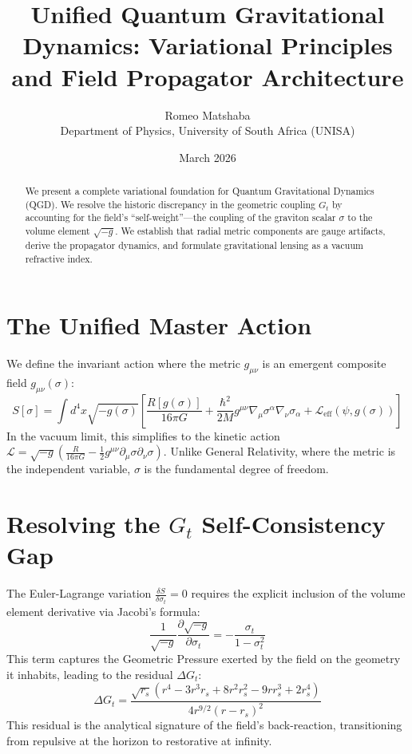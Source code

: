 \documentclass[11pt,a4paper]{article}
\title{\textbf{Unified Quantum Gravitational Dynamics: Variational Principles and Field Propagator Architecture}}
\author{Romeo Matshaba \\ \small Department of Physics, University of South Africa (UNISA)}
\date{March 2026}
\begin{document}
\maketitle

\begin{abstract}
We present a complete variational foundation for Quantum Gravitational Dynamics (QGD). We resolve the historic discrepancy in the geometric coupling $G_t$ by accounting for the field's ``self-weight''—the coupling of the graviton scalar $\sigma$ to the volume element $\sqrt{-g}$. We establish that radial metric components are gauge artifacts, derive the propagator dynamics, and formulate gravitational lensing as a vacuum refractive index.
\end{abstract}

\section{The Unified Master Action}
We define the invariant action where the metric $g_{\mu\nu}$ is an emergent composite field $g_{\mu\nu}(\sigma)$:
\begin{equation}
S[\sigma] = \int d^4x \sqrt{-g(\sigma)} \left[ \frac{R[g(\sigma)]}{16\pi G} + \frac{\hbar^2}{2M}g^{\mu\nu}\nabla_\mu\sigma^\alpha\nabla_\nu\sigma_\alpha + \mathcal{L}_{\mathrm{eff}}(\psi, g(\sigma)) \right]
\end{equation}
In the vacuum limit, this simplifies to the kinetic action $\mathcal{L} = \sqrt{-g} \left( \frac{R}{16\pi G} - \frac{1}{2} g^{\mu\nu} \partial_\mu \sigma \partial_\nu \sigma \right)$. Unlike General Relativity, where the metric is the independent variable, $\sigma$ is the fundamental degree of freedom.

\section{Resolving the $G_t$ Self-Consistency Gap}
The Euler-Lagrange variation $\frac{\delta S}{\delta \sigma_t} = 0$ requires the explicit inclusion of the volume element derivative via Jacobi’s formula:
\begin{equation}
\frac{1}{\sqrt{-g}} \frac{\partial \sqrt{-g}}{\partial \sigma_t} = -\frac{\sigma_t}{1-\sigma_t^2}
\end{equation}
This term captures the Geometric Pressure exerted by the field on the geometry it inhabits, leading to the residual $\Delta G_t$:
\begin{equation}
\Delta G_t = \frac{\sqrt{r_s}(r^4-3r^3r_s+8r^2r_s^2-9rr_s^3+2r_s^4)}{4r^{9/2}(r-r_s)^2}
\end{equation}
This residual is the analytical signature of the field’s back-reaction, transitioning from repulsive at the horizon to restorative at infinity.
\end{document}
